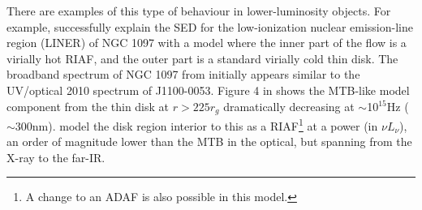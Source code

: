 \documentclass[a4paper,fleqn,usenatbib]{mnras}
\begin{document}
There are examples of this type of behaviour in lower-luminosity
objects.  For example, \citet{Nemmen2006} successfully explain the SED
for the low-ionization nuclear emission-line region (LINER) of NGC
1097 with a model where the inner part of the flow is a virially hot
RIAF, and the outer part is a standard virially cold thin disk. The
broadband spectrum of NGC 1097 from \citet{Nemmen2006} initially
appears similar to the UV/optical 2010 spectrum of J1100-0053.  Figure
4 in \citet{Nemmen2006} shows the MTB-like model component from the
thin disk at $r>225r_{g}$ dramatically decreasing at $\sim$10$^{15}$Hz
($\sim$300nm). \citet{Nemmen2006} model the disk region interior to
this as a RIAF\footnote{A change to an ADAF is also possible in this
model.} at a power (in $\nu L_{\nu}$), an order of magnitude lower
than the MTB in the optical, but spanning from the X-ray to the
far-IR.
\end{document}
